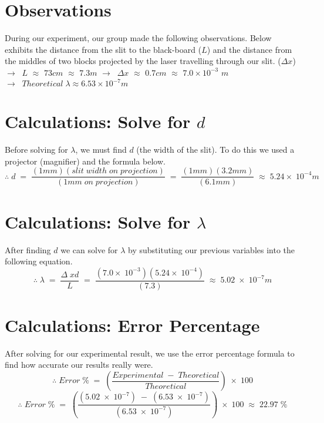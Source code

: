 \documentclass{article}
\begin{document}
\section*{Observations} {
    During our experiment, our group made the following observations. Below exhibits the distance from the slit to the black-board ($L$) and the distance from the middles of two blocks projected by the laser travelling through our slit. ($\Delta x$)\newline\newline
    $\to\;\;L$ $\approx$ $73cm$ $\approx$ $7.3m$\newline\newline
    $\to\;\;\Delta x$ $\approx$ $0.7cm$ $\approx$ $7.0\times 10^{-3}$ $m$\newline\newline
    $\to\;\;Theoretical\;\lambda \approx 6.53 \times 10^{-7}m$\newline
}
\section*{Calculations: Solve for $d$} {
    Before solving for $\lambda$, we must find $d$ (the width of the slit). To do this we used a projector (magnifier) and the formula below.\newline\newline
    \begin{equation*}
        \therefore\;d\;=\;\frac{(1mm)(slit\;width\;on\;projection)}{(1mm\;on\;projection)}\;=\;\frac{(1mm)(3.2mm)}{(6.1mm)}\;\approx\;5.24\times\;10^{-4}m
    \end{equation*}\leavevmode\newline
}
\section*{Calculations: Solve for $\lambda$} {
    After finding $d$ we can solve for $\lambda$ by substituting our previous variables into the following equation.\newline\newline
    \begin{equation*}
        \therefore\;\lambda\;=\;\frac{\Delta\;xd}{L}\;=\;\frac{(7.0\times\;10^{-3})(5.24\times\;10^{-4})}{(7.3)}\;\approx\;5.02\;\times\;10^{-7}m
    \end{equation*}\leavevmode\newline
}
\section*{Calculations: Error Percentage} {
    After solving for our experimental result, we use the error percentage formula to find how accurate our results really were.
    \begin{equation*}
        \therefore\;Error\;\%\;=\;\left(\frac{Experimental\;-\;Theoretical}{Theoretical}\right)\;\times\;100
    \end{equation*}\leavevmode
    \begin{equation*}
        \therefore\;Error\;\%\;=\;\left(\frac{(5.02\;\times\;10^{-7})\;-\;(6.53\;\times\;10^{-7})}{(6.53\;\times\;10^{-7})}\right)\;\times\;100\;\approx\; 22.97\;\%
    \end{equation*}
}
\end{document}
